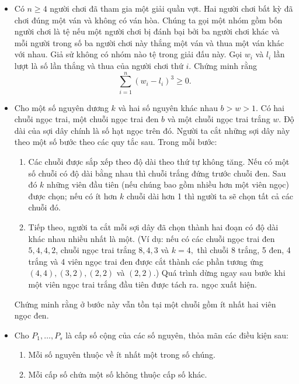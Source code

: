 \documentclass[11pt]{scrartcl}
\begin{document}
\begin{itemize}[label=, leftmargin=0em, itemsep=-0em]
    \item \begin{btvn}
        Có $n \geq 4$ người chơi đã tham gia một giải quần vợt. Hai người chơi bất kỳ đã chơi đúng một ván và không có ván hòa. Chúng ta gọi một nhóm gồm bốn người chơi là tệ nếu một người chơi bị đánh bại bởi ba người chơi khác và mỗi người trong số ba người chơi này thắng một ván và thua một ván khác với nhau. Giả sử không có nhóm nào tệ trong giải đấu này. Gọi $w_i$ và $l_i$ lần lượt là số lần thắng và thua của người chơi thứ $i$. Chứng minh rằng\[\sum^n_{i=1} \left(w_i - l_i\right)^3 \geq 0.\]
    \end{btvn}
    \item \begin{btvn}
        Cho một số nguyên dương $k$ và hai số nguyên khác nhau $b > w > 1.$ Có hai chuỗi ngọc trai, một chuỗi ngọc trai đen $b$ và một chuỗi ngọc trai trắng $w$. Độ dài của sợi dây chính là số hạt ngọc trên đó. Người ta cắt những sợi dây này theo một số bước theo các quy tắc sau. Trong mỗi bước:
        \begin{enumerate}
            \item Các chuỗi được sắp xếp theo độ dài theo thứ tự không tăng. Nếu có một số chuỗi có độ dài bằng nhau thì chuỗi trắng đứng trước chuỗi đen. Sau đó $k$ những viên đầu tiên (nếu chúng bao gồm nhiều hơn một viên ngọc) được chọn; nếu có ít hơn $k$ chuỗi dài hơn 1 thì người ta sẽ chọn tất cả các chuỗi đó.
            \item Tiếp theo, người ta cắt mỗi sợi dây đã chọn thành hai đoạn có độ dài khác nhau nhiều nhất là một. (Ví dụ: nếu có các chuỗi ngọc trai đen $5, 4, 4, 2$, chuỗi ngọc trai trắng $8, 4, 3$ và $k = 4,$ thì chuỗi 8 trắng, 5 đen, 4 trắng và 4 viên ngọc trai đen được cắt thành các phần tương ứng $(4,4), (3,2), (2,2)$ và $(2,2)$.) Quá trình dừng ngay sau bước khi một viên ngọc trai trắng đầu tiên được tách ra. ngọc xuất hiện.
        \end{enumerate}
Chứng minh rằng ở bước này vẫn tồn tại một chuỗi gồm ít nhất hai viên ngọc đen.
    \end{btvn}
    \item \begin{btvn}
        Cho $P_1, \ldots , P_s$ là cấp số cộng của các số nguyên, thỏa mãn các điều kiện sau:
        \begin{enumerate}
            \item Mỗi số nguyên thuộc về ít nhất một trong số chúng.
            \item Mỗi cấp số chứa một số không thuộc cấp số khác.
        \end{enumerate} 
        

\end{btvn}
\end{itemize}
\end{document}
